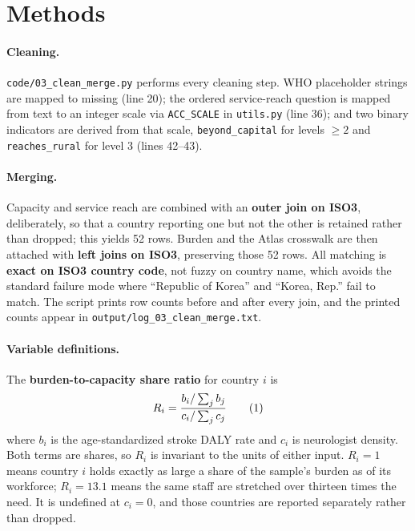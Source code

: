 \documentclass[10pt]{article}
\newcommand{\numberthis}{\refstepcounter{equation}\tag{\theequation}}
\begin{document}
\section*{Methods}

\paragraph{Cleaning.} \texttt{code/03\_clean\_merge.py} performs every cleaning
step. WHO placeholder strings are mapped to missing (line 20); the ordered
service-reach question is mapped from text to an integer scale via
\texttt{ACC\_SCALE} in \texttt{utils.py} (line 36); and two binary indicators are
derived from that scale, \texttt{beyond\_capital} for levels $\ge 2$ and
\texttt{reaches\_rural} for level $3$ (lines 42--43).

\paragraph{Merging.} Capacity and service reach are combined with an
\textbf{outer join on ISO3}, deliberately, so that a country reporting one but
not the other is retained rather than dropped; this yields 52 rows. Burden and
the Atlas crosswalk are then attached with \textbf{left joins on ISO3},
preserving those 52 rows. All matching is \textbf{exact on ISO3 country code},
not fuzzy on country name, which avoids the standard failure mode where
``Republic of Korea'' and ``Korea, Rep.'' fail to match. The script prints row
counts before and after every join, and the printed counts appear in
\texttt{output/log\_03\_clean\_merge.txt}.

\paragraph{Variable definitions.} The \textbf{burden-to-capacity share ratio}
for country $i$ is
%
\begin{align*}
R_i = \frac{b_i / \sum_j b_j}{c_i / \sum_j c_j} \numberthis \label{eqn:ratio}
\end{align*}
%
where $b_i$ is the age-standardized stroke DALY rate and $c_i$ is neurologist
density. Both terms are shares, so $R_i$ is invariant to the units of either
input. $R_i = 1$ means country $i$ holds exactly as large a share of the
sample's burden as of its workforce; $R_i = 13.1$ means the same staff are
stretched over thirteen times the need. It is undefined at $c_i = 0$, and those
countries are reported separately rather than dropped.
\end{document}
